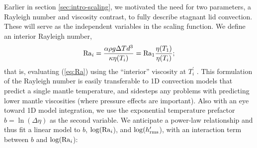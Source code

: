 \documentclass[trackchanges]{aastex63}
\begin{document}

Earlier in section \ref{sec:intro-scaling}, we motivated the need for two parameters, a Rayleigh number and viscosity contrast, to fully describe stagnant lid convection. These will serve as the independent variables in the scaling function. %
We define an interior Rayleigh number,
\begin{equation}\label{eq:Ra_i}
    {\rm Ra}_i = \frac{\alpha\rho g \Delta T d^3}{\kappa \eta(T_i)} = {\rm Ra_1} \frac{\eta(T_1)}{\eta(T_i)};
\end{equation}
that is, evaluating (\ref{eq:Ra}) using the ``interior'' viscosity at $T_i^\prime$  \citep{solomatov_scaling_2000}. This formulation of the Rayleigh number is easily transferable to 1D convection models that predict a single mantle temperature, and sidesteps any problems with predicting lower mantle viscosities (where pressure effects are important). Also with an eye toward 1D model integration, we use the exponential temperature prefactor $b = \ln (\Delta \eta)$ as the second variable. We anticipate a power-law relationship and thus fit a linear model to $b$, $\log({\rm Ra}_i$), and $\log(h_{\rm rms}^\prime$), with an interaction term between $b$ and $\log({\rm Ra}_i$):
\end{document}
